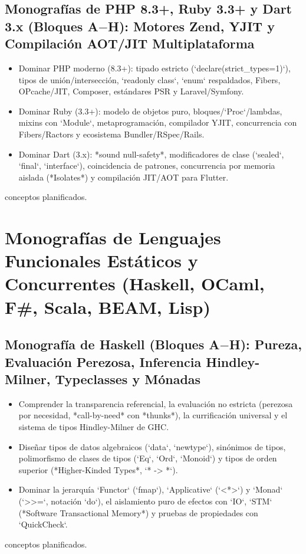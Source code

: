 \documentclass{book}
\begin{document}
\subsection*{\checkmark Monografías de PHP 8.3+, Ruby 3.3+ y Dart 3.x (Bloques A\(-\)H): Motores Zend, YJIT y Compilación AOT/JIT Multiplataforma}
\begin{itemize}
\item Dominar PHP moderno (8.3+): tipado estricto (`declare(strict\_types=1)`), tipos de unión/intersección, `readonly class`, `enum` respaldados, Fibers, OPcache/JIT, Composer, estándares PSR y Laravel/Symfony.
\item Dominar Ruby (3.3+): modelo de objetos puro, bloques/`Proc`/lambdas, mixins con `Module`, metaprogramación, compilador YJIT, concurrencia con Fibers/Ractors y ecosistema Bundler/RSpec/Rails.
\item Dominar Dart (3.x): *sound null-safety*, modificadores de clase (`sealed`, `final`, `interface`), coincidencia de patrones, concurrencia por memoria aislada (*Isolates*) y compilación JIT/AOT para Flutter.
\end{itemize}
 conceptos planificados.

\section*{Monografías de Lenguajes Funcionales Estáticos y Concurrentes (Haskell, OCaml, F\#, Scala, BEAM, Lisp)}

\subsection*{\checkmark Monografía de Haskell (Bloques A\(-\)H): Pureza, Evaluación Perezosa, Inferencia Hindley-Milner, Typeclasses y Mónadas}
\begin{itemize}
\item Comprender la transparencia referencial, la evaluación no estricta (perezosa por necesidad, *call-by-need* con *thunks*), la currificación universal y el sistema de tipos Hindley-Milner de GHC.
\item Diseñar tipos de datos algebraicos (`data`, `newtype`), sinónimos de tipos, polimorfismo de clases de tipos (`Eq`, `Ord`, `Monoid`) y tipos de orden superior (*Higher-Kinded Types*, `* -> *`).
\item Dominar la jerarquía `Functor` (`fmap`), `Applicative` (`<*>`) y `Monad` (`>>=`, notación `do`), el aislamiento puro de efectos con `IO`, `STM` (*Software Transactional Memory*) y pruebas de propiedades con `QuickCheck`.
\end{itemize}
 conceptos planificados.
\end{document}
